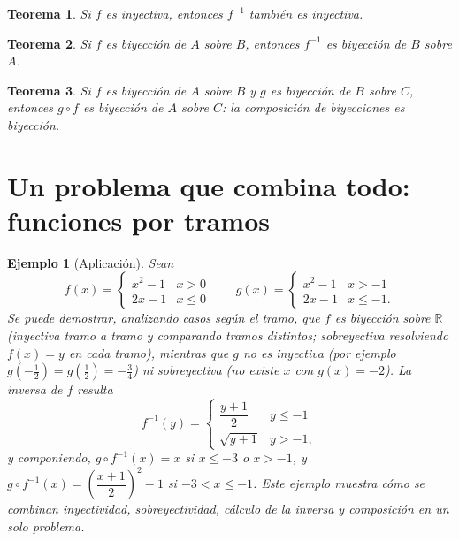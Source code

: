\documentclass[11pt]{article}
\newtheorem{teorema}{Teorema}
\newtheorem{ejemplo}{Ejemplo}
\begin{document}
\begin{teorema}
Si $f$ es inyectiva, entonces $f^{-1}$ también es inyectiva.
\end{teorema}

\begin{teorema}
Si $f$ es biyección de $A$ sobre $B$, entonces $f^{-1}$ es biyección de $B$ sobre $A$.
\end{teorema}

\begin{teorema}
Si $f$ es biyección de $A$ sobre $B$ y $g$ es biyección de $B$ sobre $C$, entonces $g\circ f$ es
biyección de $A$ sobre $C$: la composición de biyecciones es biyección.
\end{teorema}

\section{Un problema que combina todo: funciones por tramos}

\begin{ejemplo}[Aplicación]
Sean
$$f(x)=\begin{cases} x^2-1 & x>0 \\ 2x-1 & x\le 0\end{cases} \qquad
g(x)=\begin{cases} x^2-1 & x>-1 \\ 2x-1 & x\le -1.\end{cases}$$
Se puede demostrar, analizando casos según el tramo, que $f$ es biyección sobre $\mathbb{R}$
(inyectiva tramo a tramo y comparando tramos distintos; sobreyectiva resolviendo $f(x)=y$ en cada
tramo), mientras que $g$ no es inyectiva (por ejemplo $g(-\tfrac12)=g(\tfrac12)=-\tfrac34$) ni
sobreyectiva (no existe $x$ con $g(x)=-2$). La inversa de $f$ resulta
$$f^{-1}(y) = \begin{cases} \dfrac{y+1}{2} & y \le -1 \\[4pt] \sqrt{y+1} & y > -1,\end{cases}$$
y componiendo, $g\circ f^{-1}(x) = x$ si $x \le -3$ o $x > -1$, y
$g\circ f^{-1}(x) = \left(\dfrac{x+1}{2}\right)^2 - 1$ si $-3 < x \le -1$. Este ejemplo muestra cómo
se combinan inyectividad, sobreyectividad, cálculo de la inversa y composición en un solo problema.
\end{ejemplo}
\end{document}
